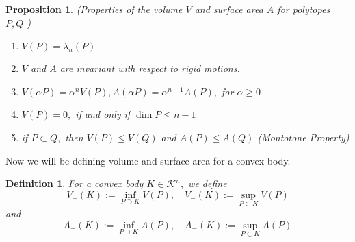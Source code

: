 \documentclass[oneside]{book}
\newtheorem{mydef}{Definition}
\newtheorem{prop}{Proposition}
\begin{document}
\begin{prop} \label{prop:1}
(Properties of the volume $V$ and surface area $A$ for polytopes $P, Q$ )
 \begin{enumerate}
 \item  $V(P)=\lambda_{n}(P)$
 \item  $V$ and $A$ are invariant with respect to rigid motions.
 \item $V(\alpha P)=\alpha^{n} V(P), A(\alpha P)=\alpha^{n-1} A(P),$ for $\alpha \geq 0$
 \item $V(P)=0,$ if and only if $\operatorname{dim} P \leq n-1$
 \item  if $P \subset Q,$ then $V(P) \leq V(Q)$ and $A(P) \leq A(Q)$    (Montotone Property)   \label{prop:5}
 \end{enumerate}
  \end{prop}
 
Now we will be defining volume and surface area for a convex body.\\
 \begin{mydef}
  For a convex body $K \in \mathcal{K}^{n},$ we define
$$ V_{+}(K):=\inf _{P \supset K} V(P), \quad V_{-}(K):=\sup _{P \subset K} V(P)$$ 
and
$$ A_{+}(K):=\inf _{P \supset K} A(P), \quad A_{-}(K):=\sup _{P \subset K} A(P) $$ 
 \end{mydef}
 
\end{document}
